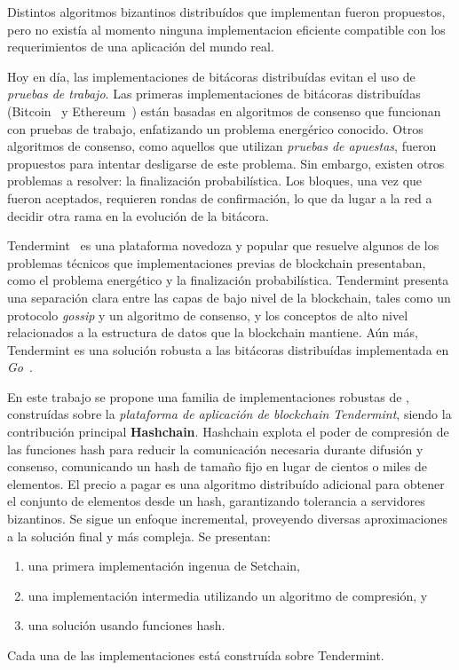 %

Distintos algoritmos bizantinos distribuídos que implementan \setchain fueron
propuestos, pero no existía al momento ninguna implementacion eficiente compatible con
los requerimientos de una aplicación del mundo real.

Hoy en día, las implementaciones de bitácoras distribuídas evitan el uso de
\emph{pruebas de trabajo}.
%
Las primeras implementaciones de bitácoras distribuídas (Bitcoin~\cite{nakamoto06bitcoin}
y Ethereum~\cite{ethereum}) están basadas en algoritmos de consenso que funcionan con
pruebas de trabajo, enfatizando un problema energérico conocido\cite{energy.problem.bitcoin}.
%
Otros algoritmos de consenso, como aquellos que utilizan \emph{pruebas de apuestas},
fueron propuestos para intentar desligarse de este problema.
%
Sin embargo, existen otros problemas a resolver: la finalización probabilística.
%
Los bloques, una vez que fueron aceptados, requieren rondas de confirmación, lo que da
lugar a la red a decidir otra rama en la evolución de la  bitácora.


Tendermint~\cite{Buchman.2018.Tendermint} es una plataforma novedoza y popular que resuelve
algunos de los problemas técnicos que implementaciones previas de blockchain presentaban,
como el problema energético y la finalización probabilística.
%
Tendermint presenta una separación clara entre las capas de bajo nivel de la blockchain,
tales como un protocolo \textit{gossip} y un algoritmo de consenso, y los conceptos de alto
nivel relacionados a la estructura de datos que la blockchain mantiene.
%
Aún más, Tendermint es una solución robusta a las bitácoras distribuídas implementada
en \emph{Go}~\cite{donovan15go}.

%

%
%
En este trabajo se propone una familia de implementaciones robustas de \setchain,
construídas sobre la \emph{plataforma de aplicación de blockchain Tendermint},
siendo la contribución principal \textbf{Hashchain}.
%
Hashchain explota el poder de compresión de las funciones hash para reducir la
comunicación necesaria durante difusión y consenso, comunicando un hash de tamaño
fijo en lugar de cientos o miles de elementos.
%
El precio a pagar es una algoritmo distribuído adicional para obtener el conjunto de
elementos desde un hash, garantizando tolerancia a servidores bizantinos.
%
Se sigue un enfoque incremental, proveyendo diversas aproximaciones a la solución
final y más compleja. Se presentan:
\begin{enumerate}
  \item una primera implementación ingenua de Setchain,
  \item una implementación intermedia utilizando un algoritmo de compresión, y
  \item una solución usando funciones hash.
\end{enumerate}
%
%
Cada una de las implementaciones está construída sobre Tendermint.

